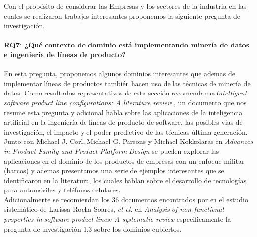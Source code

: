 Con el propósito de considerar las Empresas y los sectores de la industria en las cuales se realizaron trabajos interesantes proponemos la siguiente pregunta de investigación.
\paragraph{RQ7: ¿Qué contexto de dominio está implementando minería de datos e ingeniería de líneas de producto?}

En esta pregunta, proponemos algunos dominios interesantes que ademas de implementar líneas de productos también hacen uso de las técnicas de minería de datos.  Como resultados representativos de esta sección recomendamos\textit{Intelligent software product line configurations: A literature review} \cite{Afzal2016a}, un documento que nos resume esta pregunta y adicional habla sobre las aplicaciones de la inteligencia artificial en la ingeniería de líneas de producto de software, las posibles vias de investigación, el impacto y el poder predictivo de las técnicas última generación.\\
Junto con Michael J. Corl, Michael G. Parsons y Michael Kokkolaras en \textit{Advances in Product Family and Product Platform Design}\cite{Kwak2011} se pueden explorar las aplicaciones en el dominio de los productos de empresas con un enfoque militar (barcos) y ademas presentamos una serie de ejemplos interesantes que se identificaron en la literatura, los cuales hablan sobre el desarrollo de tecnologías para automóviles y teléfonos celulares.\\
Adicionalmente se recomiendan los $36$ documentos encontrados por en el estudio sistemático de Larissa Rocha Soares, \textit{et al.} en \textit{Analysis of non-functional properties in software product lines: A systematic review}\cite{Soares2014} especificamente la pregunta de investigación 1.3 sobre los dominios cubiertos.
 
